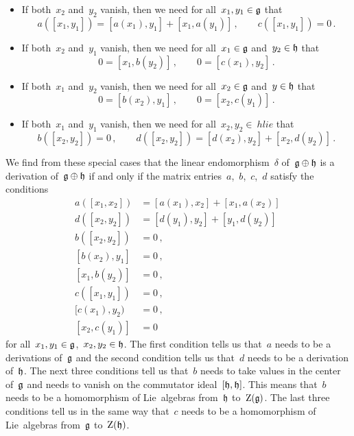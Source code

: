\begin{example}
\begin{itemize}
		\item
			If both~$x_2$ and~$y_2$ vanish, then we need for all~$x_1, y_1 \in \mathfrak{g}$ that
			\[
				a( [x_1, y_1] )
				=
				[a(x_1), y_1] + [x_1, a(y_1)] \,,
				\qquad
				c( [x_1, y_1] )
				=
				0 \,.
			\]
		\item
			If both~$x_2$ and~$y_1$ vanish, then we need for all~$x_1 \in \mathfrak{g}$ and~$y_2 \in \mathfrak{h}$ that
			\[
				0
				=
				[ x_1, b(y_2) ] \,,
				\qquad
				0
				=
				[ c(x_1), y_2 ] \,.
			\]
		\item
			If both~$x_1$ and~$y_2$ vanish, then we need for all~$x_2 \in \mathfrak{g}$ and~$y \in \mathfrak{h}$ that
			\[
				0
				=
				[ b(x_2), y_1 ] \,,
				\qquad
				0
				=
				[ x_2, c(y_1) ] \,.
			\]
		\item
			If both~$x_1$ and~$y_1$ vanish, then we need for all~$x_2, y_2 \in \ hlie$ that
			\[
				b( [x_2, y_2] )
				=
				0 \,,
				\qquad
				d( [x_2, y_2] )
				=
				[ d(x_2), y_2 ] + [ x_2, d(y_2) ] \,.
			\]
	\end{itemize}
	We find from these special cases that the linear endomorphism~$\delta$ of~$\mathfrak{g} \oplus \mathfrak{h}$ is a derivation of~$\mathfrak{g} \oplus \mathfrak{h}$ if and only if the matrix entries~$a$,~$b$,~$c$,~$d$ satisfy the conditions
	\begin{align*}
		a( [x_1, x_2] ) &= [ a(x_1), x_2 ] + [ x_1, a(x_2) ] \,\\
		d( [x_2, y_2] ) &= [ d(y_1), y_2 ] + [ y_1, d(y_2) ] \,\\
		b( [x_2, y_2] ) &= 0 \,, \\
		[ b(x_2), y_1]  &= 0 \,, \\
		[ x_1, b(y_2) ] &= 0 \,, \\
		c( [x_1, y_1] ) &= 0 \,, \\
		[ c(x_1), y_2 ) &= 0 \,, \\
		[ x_2, c(y_1) ] &= 0
	\end{align*}
	for all~$x_1, y_1 \in \mathfrak{g}$,~$x_2, y_2 \in \mathfrak{h}$.
	The first condition tells us that~$a$ needs to be a derivations of~$\mathfrak{g}$ and the second condition tells us that~$d$ needs to be a derivation of~$\mathfrak{h}$.
	The next three conditions tell us that~$b$ needs to take values in the center of~$\mathfrak{g}$ and needs to vanish on the commutator ideal~$[\mathfrak{h}, \mathfrak{h}]$.
	This means that~$b$ needs to be a homomorphism of Lie~algebras from~$\mathfrak{h}$ to~$\operatorname{Z}(\mathfrak{g})$.
	The last three conditions tell us in the same way that~$c$ needs to be a homomorphism of Lie~algebras from~$\mathfrak{g}$ to~$\operatorname{Z}(\mathfrak{h})$.


\end{example}

